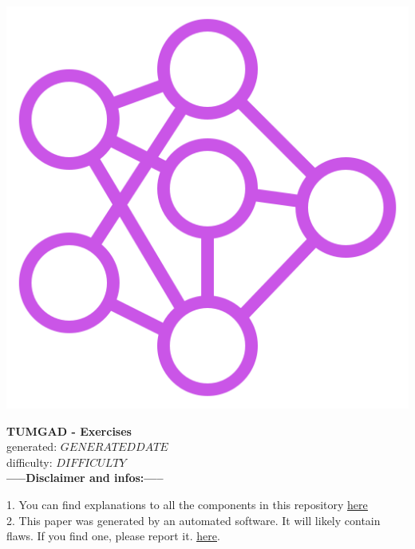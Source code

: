 \documentclass[12pt]{article}
\begin{document}

    \begin{center}
        \includegraphics[scale=0.25]{favicon.png} %
        \vspace{15px}

        {\selectfont
            \textbf{\LARGE{TUMGAD - Exercises}}\\
        generated: $GENERATEDDATE$
        \\
        difficulty: $DIFFICULTY$
        \\
        }
        \vspace{20px}
        \textbf{\LARGE{-----Disclaimer and infos:-----}}
        \\[0.2in]
    \end{center}
        1. You can find explanations to all the components in this repository \href{https://sebastianoner.github.io/TUMGAD/src/routes}{\underline{here}}
        \\[0.2in]
        2. This paper was generated by an automated software.
        It will likely contain flaws.
        If you find one, please report it.
        \href{https://github.com/SebastianOner/TUMGAD/issues/new?assignees=&labels=&template=bug_report.md&title=}{\underline{here}}.
        \\[0.2in]
\end{document}
